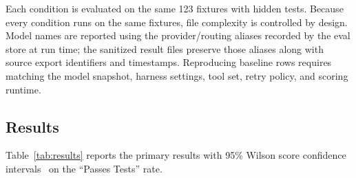 \documentclass[11pt,letterpaper]{article}
\begin{document}
Each condition is evaluated on the same 123 fixtures with hidden tests. Because every condition runs on the same fixtures, file complexity is controlled by design.
Model names are reported using the provider/routing aliases recorded by the eval store at run time; the sanitized result files preserve those aliases along with source export identifiers and timestamps. Reproducing baseline rows requires matching the model snapshot, harness settings, tool set, retry policy, and scoring runtime.

\subsection{Results}

Table~\ref{tab:results} reports the primary results with 95\% Wilson score confidence intervals~\citep{wilson1927probable} on the ``Passes Tests'' rate.

\begin{table}[ht]
\centering
\caption{Baseline results on the full \textsc{RefactorBench}-JS run ($n=123$ fixtures per condition). ``Passes Tests'' is the number of fixtures whose hidden tests pass after refactoring. 95\% Wilson score CIs are reported on the pass rate. Duration is wall-clock time per fixture in minutes.}
\label{tab:results}
\small
{}
\end{table}
\end{document}

